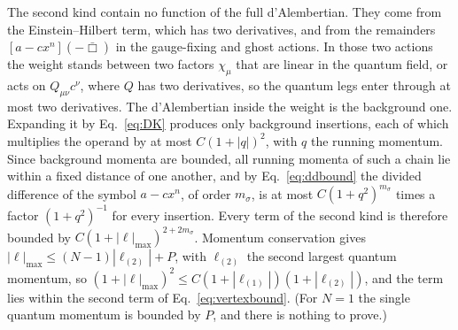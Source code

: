 \documentclass[aps,prd,10pt,twocolumn,superscriptaddress,nofootinbib,floatfix,longbibliography]{revtex4-2}
\begin{document}
The second kind contain no function of the full d'Alembertian. They come from the Einstein--Hilbert term, which has two derivatives, and from the remainders $[a-cx^n](-\bar\Box)$ in the gauge-fixing and ghost actions. In those two actions the weight stands between two factors $\chi_\mu$ that are linear in the quantum field, or acts on $Q_{\mu\nu}c^\nu$, where $Q$ has two derivatives, so the quantum legs enter through at most two derivatives. The d'Alembertian inside the weight is the background one. Expanding it by Eq.~\eqref{eq:DK} produces only background insertions, each of which multiplies the operand by at most $C(1+|q|)^2$, with $q$ the running momentum. Since background momenta are bounded, all running momenta of such a chain lie within a fixed distance of one another, and by Eq.~\eqref{eq:ddbound} the divided difference of the symbol $a-cx^n$, of order $m_\sigma$, is at most $C(1+q^2)^{m_\sigma}$ times a factor $(1+q^2)^{-1}$ for every insertion. Every term of the second kind is therefore bounded by $C(1+|\ell|_{\max})^{2+2m_\sigma}$. Momentum conservation gives $|\ell|_{\max}\le(N-1)|\ell_{(2)}|+P$, with $\ell_{(2)}$ the second largest quantum momentum, so $(1+|\ell|_{\max})^2\le C(1+|\ell_{(1)}|)(1+|\ell_{(2)}|)$, and the term lies within the second term of Eq.~\eqref{eq:vertexbound}. (For $N=1$ the single quantum momentum is bounded by $P$, and there is nothing to prove.)
\end{document}
